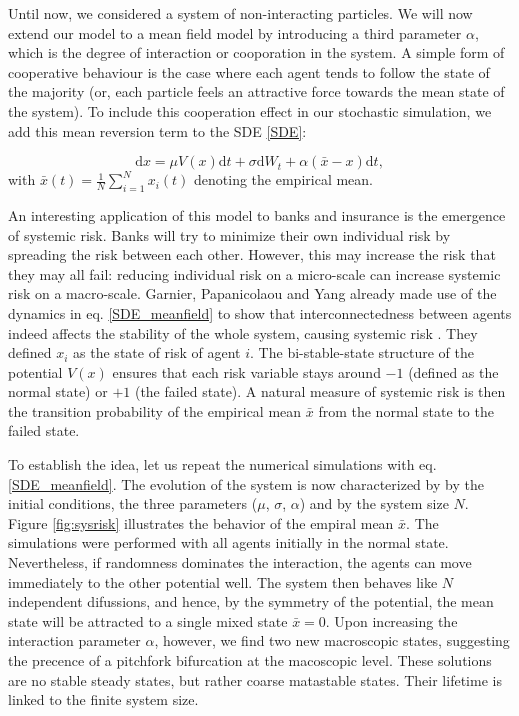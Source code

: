\documentclass[]{article}
\newcommand{\dd}{\ensuremath{\mathrm{d}}}
\begin{document}

Until now, we considered a system of non-interacting particles. We will now extend our model to a mean field model by introducing a third parameter $\alpha$, which is the degree of interaction or cooporation in the system. A simple form of cooperative behaviour is the case where each agent tends to follow the state of the majority (or, each particle feels an attractive force towards the mean state of the system). To include this cooperation effect in our stochastic simulation, we add this mean reversion term to the SDE \eqref{SDE}:

\begin{equation} 
\label{SDE_meanfield}
    \dd x = \mu V(x) \dd t + \sigma  \dd{W_t} + \alpha(\bar{x} -x) \dd t ,
\end{equation}
with  $\bar{x}(t) = \frac{1}{N} \sum_{i=1}^{N} x_i(t)$ denoting the empirical mean. 


An interesting application of this model to banks and insurance is the emergence of systemic risk.  Banks will try to minimize their own individual risk by spreading the risk between each other. However, this may increase the risk that they may all fail: reducing individual risk on a micro-scale can increase systemic risk on a macro-scale. 
Garnier, Papanicolaou and Yang already made use of the dynamics in eq. \eqref{SDE_meanfield}  to show that interconnectedness between agents indeed affects the stability of the whole system, causing systemic risk  \cite{Garnier}. They defined $x_i$  as the state of risk of agent $i$. The bi-stable-state structure of the potential $V(x)$ ensures that each risk variable stays around $-1$ (defined as the normal state) or $+1$ (the failed state).  A natural measure of systemic risk is then the transition probability of the empirical mean $\bar{x}$ from the normal state to the failed state. 
 

To establish the idea, let us repeat the numerical simulations with eq. \ref{SDE_meanfield}. The evolution of the system is now characterized by  by the initial conditions, the three parameters ($\mu$, $\sigma$, $\alpha$) and by the system size $N$. Figure \ref{fig:sysrisk}  illustrates the behavior of the empiral mean $\bar{x}$. The simulations were performed with all agents initially in the normal state. Nevertheless, if randomness dominates the interaction, the agents can move immediately to the other potential well. The system then behaves like $N$ independent difussions, and hence, by the symmetry of the potential, the mean state will be attracted to a single mixed state $\bar{x}=0$. Upon increasing the interaction parameter $\alpha$, however, we find two new macroscopic states, suggesting the precence of a pitchfork bifurcation at the macoscopic level. These solutions are no stable steady states, but rather coarse matastable states. Their lifetime is linked to the finite system size. 
\end{document}
